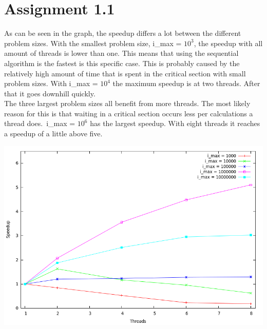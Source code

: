 \documentclass[12pt]{article}
\begin{document}
\maketitle
\section{Assignment 1.1}

As can be seen in the graph, the speedup differs a lot between the different
problem sizes. With the smallest problem size, i\_max = $10^3$, the speedup
with all amount of threads is lower than one. This means that using the
sequential algorithm  is the fastest is this specific case. This is probably
caused by the relatively high amount of time that is spent in the critical
section with small problem sizes. With i\_max = $10^4$ the maximum speedup is at
two threads. After that it goes downhill quickly. \\
The three largest problem sizes all benefit from more threads. The most likely
reason for this is that waiting in a critical section occurs less per
calculations a thread does.\ i\_max = $10^6$ has the largest speedup. With eight
threads it reaches a speedup of a little above five.

\includegraphics[width=\textwidth]{speedupgraph.png}
\end{document}
